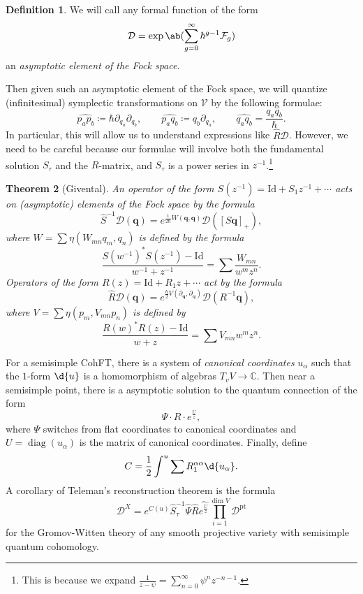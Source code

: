 \documentclass{amsart}
\newtheorem{thm}{Theorem}[section]
\theoremstyle{definition}
\newtheorem{defn}[thm]{Definition}
\theoremstyle{remark}
\theoremstyle{plain}
\theoremstyle{definition}
\theoremstyle{remark}
\newcommand{\C}{\mathbb{C}}
\newcommand{\mc}[1]{\mathcal{#1}}
\newcommand{\mbf}[1]{\mathbf{#1}}
\newcommand{\bq}{\mbf{q}}
\newcommand{\mr}[1]{\mathrm{#1}}
\newcommand{\on}[1]{\operatorname{#1}}
\newcommand{\wh}[1]{\widehat{#1}}
\newcommand{\1}{\mathbf{1}}
\newcommand{\2}{\mathbf{2}}
\newcommand{\3}{\mathbf{3}}
\begin{document}
\begin{defn}
    We will call any formal function of the form
    \[ \mc{D} = \exp\ab(\sum_{g=0}^{\infty} \hbar^{g-1} \mc{F}_g) \]
    an \textit{asymptotic element of the Fock space}.
\end{defn}

Then given such an asymptotic element of the Fock space, we will quantize (infinitesimal) symplectic transformations on $\mc{V}$ by the following formulae:
\[ \wh{p_a p_b} \coloneqq \hbar \partial_{q_a} \partial_{q_b}, \qquad \wh{p_a q_b} \coloneqq q_b \partial_{q_a}, \qquad \wh{q_a q_b} = \frac{q_a q_b}{\hbar}. \]
In particular, this will allow us to understand expressions like $\hat{R} \mc{D}$. However, we need to be careful because our formulae will involve both the fundamental solution $S_{\tau}$ and the $R$-matrix, and $S_{\tau}$ is a power series in $z^{-1}$.\footnote{This is because we expand $\frac{1}{z-\psi} = \sum_{n=0}^{\infty} \psi^n z^{-n-1}$.}

\begin{thm}[Givental]
    An operator of the form $S(z^{-1}) = \mr{Id} + S_1 z^{-1} + \cdots$ acts on (asymptotic) elements of the Fock space by the formula
    \[ \hat{S}^{-1} \mc{D}(\bq) = e^{\frac{1}{2\hbar}W(\bq,\bq)} \mc{D}([S \bq]_+), \]
    where $W = \sum \eta(W_{mn}q_m, q_n)$ is defined by the formula
    \[ \frac{S(w^{-1})^* S(z^{-1}) - \mr{Id}}{w^{-1}+z^{-1}} = \sum \frac{W_{mn}}{w^m z^n}. \]
    Operators of the form $R(z) = \mr{Id} + R_1 z + \cdots$ act by the formula
    \[ \hat{R}\mc{D}(\bq) = e^{\frac{\hbar}{2} V(\partial_{\bq}, \partial_{\bq})} \mc{D}(R^{-1} \bq), \]
    where $V = \sum \eta(p_m, V_{mn} p_n)$ is defined by 
    \[ \frac{R(w)^* R(z) - \mr{Id}}{w+z} = \sum V_{mn} w^m z^n. \]
\end{thm}

For a semisimple CohFT, there is a system of \textit{canonical coordinates} $u_{\alpha}$ such that the $1$-form $\d{u}$ is a homomorphism of algebras $T_v V \to \C$. Then near a semisimple point, there is a asymptotic solution to the quantum connection of the form
\[ \Psi \cdot  R \cdot e^{\frac{U}{z}}, \]
where $\Psi$ switches from flat coordinates to canonical coordinates and $U = \on{diag}(u_{\alpha})$ is the matrix of canonical coordinates. Finally, define
\[ C = \frac{1}{2} \int^u \sum R_1^{\alpha\alpha} \d{u_{\alpha}}. \]
A corollary of Teleman's reconstruction theorem is the formula
\[ \mc{D}^X = e^{C(u)} \hat{S}^{-1}_{\tau} \hat{\Psi} \hat{R} \wh{e^{\frac{U}{z}}} \prod_{i=1}^{\dim V} \mc{D}^{\mr{pt}} \]
for the Gromov-Witten theory of any smooth projective variety with semisimple quantum cohomology.
\end{document}
